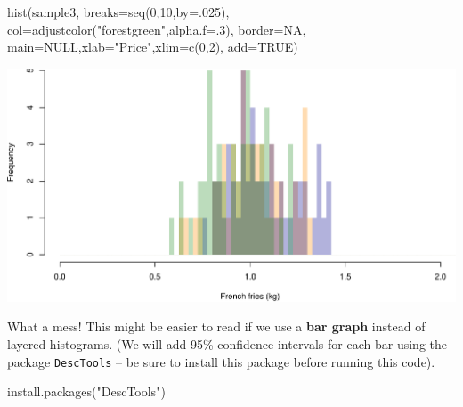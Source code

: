 \documentclass[
]{book}
\newenvironment{Shaded}{\begin{snugshade}}{\end{snugshade}}
\newcommand{\AttributeTok}[1]{\textcolor[rgb]{0.77,0.63,0.00}{#1}}
\newcommand{\ConstantTok}[1]{\textcolor[rgb]{0.00,0.00,0.00}{#1}}
\newcommand{\DecValTok}[1]{\textcolor[rgb]{0.00,0.00,0.81}{#1}}
\newcommand{\FunctionTok}[1]{\textcolor[rgb]{0.00,0.00,0.00}{#1}}
\newcommand{\NormalTok}[1]{#1}
\newcommand{\StringTok}[1]{\textcolor[rgb]{0.31,0.60,0.02}{#1}}
\begin{document}
\begin{Shaded}
\begin{Highlighting}[]
\FunctionTok{hist}\NormalTok{(sample3,}
     \AttributeTok{breaks=}\FunctionTok{seq}\NormalTok{(}\DecValTok{0}\NormalTok{,}\DecValTok{10}\NormalTok{,}\AttributeTok{by=}\NormalTok{.}\DecValTok{025}\NormalTok{),}
     \AttributeTok{col=}\FunctionTok{adjustcolor}\NormalTok{(}\StringTok{"forestgreen"}\NormalTok{,}\AttributeTok{alpha.f=}\NormalTok{.}\DecValTok{3}\NormalTok{),}
     \AttributeTok{border=}\ConstantTok{NA}\NormalTok{,}
     \AttributeTok{main=}\ConstantTok{NULL}\NormalTok{,}\AttributeTok{xlab=}\StringTok{"Price"}\NormalTok{,}\AttributeTok{xlim=}\FunctionTok{c}\NormalTok{(}\DecValTok{0}\NormalTok{,}\DecValTok{2}\NormalTok{),}
     \AttributeTok{add=}\ConstantTok{TRUE}\NormalTok{)}
\end{Highlighting}
\end{Shaded}

\includegraphics{figures/unnamed-chunk-232-1.pdf}

What a mess! This might be easier to read if we use a \textbf{bar graph} instead of layered histograms. (We will add 95\% confidence intervals for each bar using the package \texttt{DescTools} -- be sure to install this package before running this code).

\begin{Shaded}
\begin{Highlighting}[]
\FunctionTok{install.packages}\NormalTok{(}\StringTok{"DescTools"}\NormalTok{)}
\end{Highlighting}
\end{Shaded}
\end{document}
